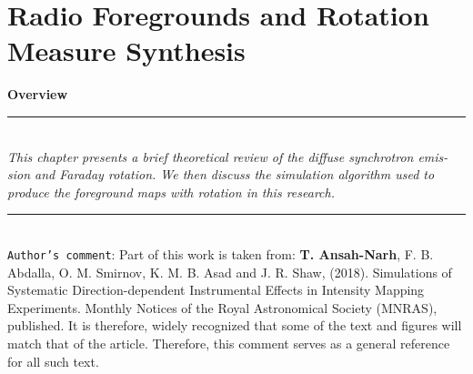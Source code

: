 \chapter{Radio Foregrounds and Rotation Measure Synthesis} %

\label{Chapter3} %

\textbf{Overview}\\
\par\noindent\rule{\textwidth}{0.4pt}\\
\textit{This chapter presents a brief theoretical review of the diffuse synchrotron emis-
sion and Faraday rotation. We then discuss the simulation algorithm used to
produce the foreground maps with rotation in this research.}
\par\noindent\rule{\textwidth}{0.4pt}\\



\noindent \texttt{Author’s comment}: 
\small{Part of this work is taken from: \textbf{T. Ansah-Narh}, F. B. Abdalla, O. M. Smirnov, K. M. B. Asad and J. R. Shaw, (2018). Simulations of Systematic Direction-dependent Instrumental Effects in Intensity Mapping Experiments. Monthly Notices of the Royal Astronomical Society (MNRAS), published. It is therefore, widely recognized that some of the text and figures will match that of the article. Therefore, this comment serves as a general reference for all such text.
}

